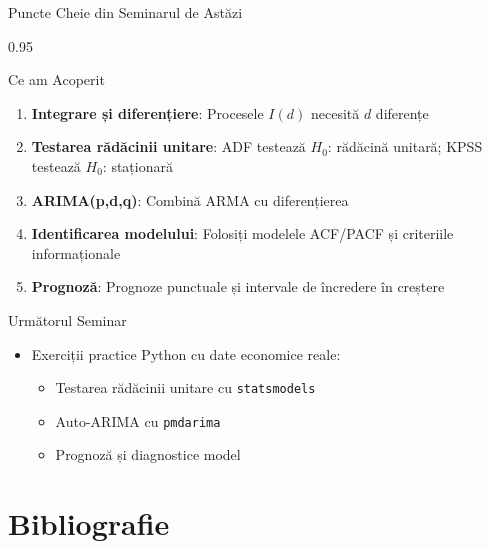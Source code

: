 \documentclass[9pt, aspectratio=169, t]{beamer}
\begin{document}
\begin{frame}{Puncte Cheie din Seminarul de Astăzi}
    \begin{cminipage}{0.95\textwidth}
    \begin{block}{Ce am Acoperit}
        \begin{enumerate}\setlength{\itemsep}{0pt}
            \item \textbf{Integrare și diferențiere}: Procesele $I(d)$ necesită $d$ diferențe
            \item \textbf{Testarea rădăcinii unitare}: ADF testează $H_0$: rădăcină unitară; KPSS testează $H_0$: staționară
            \item \textbf{ARIMA(p,d,q)}: Combină ARMA cu diferențierea
            \item \textbf{Identificarea modelului}: Folosiți modelele ACF/PACF și criteriile informaționale
            \item \textbf{Prognoză}: Prognoze punctuale și intervale de încredere în creștere
        \end{enumerate}
    \end{block}

    \vspace{0.3cm}

    \begin{exampleblock}{Următorul Seminar}
        \begin{itemize}\setlength{\itemsep}{0pt}
            \item Exerciții practice Python cu date economice reale:
            \begin{itemize}\setlength{\itemsep}{0pt}
                \item Testarea rădăcinii unitare cu \texttt{statsmodels}
                \item Auto-ARIMA cu \texttt{pmdarima}
                \item Prognoză și diagnostice model
            \end{itemize}
        \end{itemize}
    \end{exampleblock}
    \end{cminipage}
\end{frame}

\section{Bibliografie}
\end{document}

